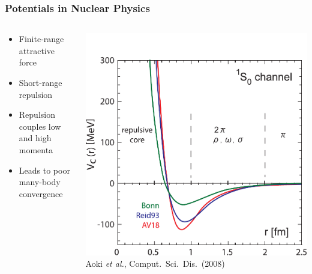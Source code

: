 \documentclass[accentcolor=tud2c,usenames,dvipsnames,colorbacktitle,inverttitle,landscape,german,presentation,t]{tudbeamer}
\begin{document}
  \begin{frame}
    \frametitle{Potentials in Nuclear Physics}
    \begin{columns}[c]
      \begin{column}{0.6\textwidth}
        \begin{itemize}
          \item Finite-range attractive force
          \item Short-range repulsion
          \item Repulsion couples low and high momenta
          \item Leads to poor many-body convergence
        \end{itemize}
      \end{column}
      \begin{column}{0.4\textwidth}
        \begin{center}
          \includegraphics[width=\textwidth]{figures/02/hatsuda_phen-pot_new}
          \\ \footnotesize{Aoki \textit{et al.}, Comput.~Sci.~Dis.~(2008)}
        \end{center}
      \end{column}
    \end{columns}
  \end{frame}
\end{document}
